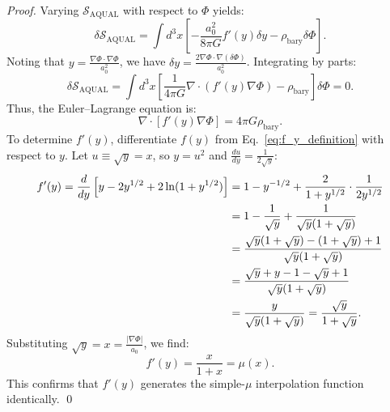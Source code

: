 \documentclass[11pt,a4paper]{article}
\theoremstyle{definition}
\begin{document}
\begin{proof}
Varying $\mathcal{S}_{\text{AQUAL}}$ with respect to $\Phi$ yields:
\begin{equation}
\delta \mathcal{S}_{\text{AQUAL}} = \int d^3x \left[ -\frac{a_0^2}{8\pi G} f'(y) \delta y - \rho_{\text{bary}} \delta\Phi \right].
\end{equation}
Noting that $y = \frac{\nabla\Phi \cdot \nabla\Phi}{a_0^2}$, we have $\delta y = \frac{2\nabla\Phi \cdot \nabla(\delta\Phi)}{a_0^2}$. Integrating by parts:
\begin{equation}
\delta \mathcal{S}_{\text{AQUAL}} = \int d^3x \left[ \frac{1}{4\pi G} \nabla \cdot \left( f'(y) \nabla\Phi \right) - \rho_{\text{bary}} \right] \delta\Phi = 0.
\end{equation}
Thus, the Euler--Lagrange equation is:
\begin{equation}
\nabla \cdot \left[ f'(y) \nabla\Phi \right] = 4\pi G \rho_{\text{bary}}.
\end{equation}
To determine $f'(y)$, differentiate $f(y)$ from Eq.~\eqref{eq:f_y_definition} with respect to $y$. Let $u \equiv \sqrt{y} = x$, so $y = u^2$ and $\frac{du}{dy} = \frac{1}{2\sqrt{y}}$:
\begin{align}
f'(y) = \frac{d}{dy} \left[ y - 2y^{1/2} + 2\ln(1 + y^{1/2}) \right] 
&= 1 - y^{-1/2} + \frac{2}{1 + y^{1/2}} \cdot \frac{1}{2 y^{1/2}} \notag \\
&= 1 - \frac{1}{\sqrt{y}} + \frac{1}{\sqrt{y}(1 + \sqrt{y})} \notag \\
&= \frac{\sqrt{y}(1 + \sqrt{y}) - (1 + \sqrt{y}) + 1}{\sqrt{y}(1 + \sqrt{y})} \notag \\
&= \frac{\sqrt{y} + y - 1 - \sqrt{y} + 1}{\sqrt{y}(1 + \sqrt{y})} \notag \\
&= \frac{y}{\sqrt{y}(1 + \sqrt{y})} = \frac{\sqrt{y}}{1 + \sqrt{y}}.
\end{align}
Substituting $\sqrt{y} = x = \frac{|\nabla\Phi|}{a_0}$, we find:
\begin{equation}
f'(y) = \frac{x}{1+x} = \mu(x).
\end{equation}
This confirms that $f'(y)$ generates the simple-$\mu$ interpolation function identically. \qed
\end{proof}
\end{document}
